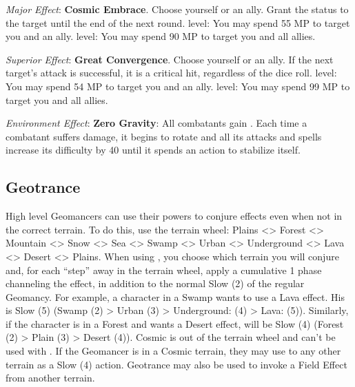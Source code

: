 \begin{multicols}{2}
\textit{Major Effect}: \textbf{Cosmic Embrace}. Choose yourself or an ally. Grant the  status to the target until the end of the next round.  level: You may spend 55 MP to target you and an ally.  level: You may spend 90 MP to target you and all allies.

\textit{Superior Effect}: \textbf{Great Convergence}. Choose yourself or an ally. If the next target’s attack is successful, it is a critical hit, regardless of the dice roll.  level: You may spend 54 MP to target you and an ally.  level: You may spend 99 MP to target you and all allies.

\textit{Environment Effect}: \textbf{Zero Gravity}: All combatants gain . Each time a combatant suffers damage, it begins to rotate and all its attacks and spells increase its difficulty by 40 until it spends an action to stabilize itself.

\end{multicols}
 
\subsection*{Geotrance}\label{subsec:geo-trance}

\begin{multicols}{2}


High level Geomancers can use their powers to conjure effects even when not in the correct terrain. To do this, use the terrain wheel: Plains <> Forest <> Mountain <> Snow <> Sea <> Swamp <> Urban <> Underground <> Lava <> Desert <> Plains. When using , you choose which terrain you will conjure and, for each “step” away in the terrain wheel, apply a cumulative 1 phase channeling the effect, in addition to the normal Slow (2) of the regular Geomancy. For example, a character in a Swamp wants to use a Lava effect. His  is Slow (5) (Swamp (2) > Urban (3) > Underground: (4) > Lava: (5)). Similarly, if the character is in a Forest and wants a Desert effect,  will be Slow (4) (Forest (2) > Plain (3) > Desert (4)). Cosmic is out of the terrain wheel and can’t be used with . If the Geomancer is in a Cosmic terrain, they may use  to any other terrain as a Slow (4) action. Geotrance may also be used to invoke a Field Effect from another terrain.


\begin{center}
\end{center}
\end{multicols}